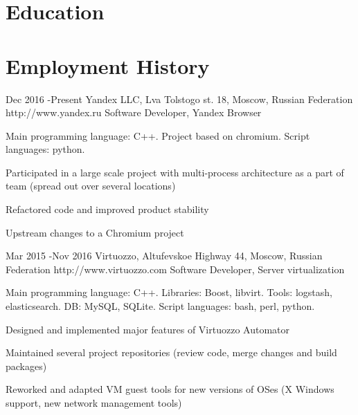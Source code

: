 \documentclass[10pt]{article} %
\begin{document}
\section{Education}



\section{Employment History}

\job
{Dec 2016 -}{Present}
{Yandex LLC, Lva Tolstogo st. 18, Moscow, Russian Federation}
{http://www.yandex.ru}
{Software Developer, Yandex Browser}
{
Main programming language: C++. Project based on chromium. Script languages: python.
\begin{itemize-noindent}
\setlength\itemsep{0em}
\item{Participated in a large scale project with multi-process architecture as a part of team (spread out over several locations)}
\item{Refactored code and improved product stability}
\item{Upstream changes to a Chromium project}
\end{itemize-noindent}
}


\job
{Mar 2015 -}{Nov 2016}
{Virtuozzo, Altufevskoe Highway 44, Moscow, Russian Federation}
{http://www.virtuozzo.com}
{Software Developer, Server virtualization}
{
Main programming language: C++. Libraries: Boost, libvirt. Tools: logstash, elasticsearch. DB: MySQL, SQLite. Script languages: bash, perl, python.
\begin{itemize-noindent}
\setlength\itemsep{0em}
\item{Designed and implemented major features of Virtuozzo Automator}
\item{Maintained several project repositories (review code, merge changes and build packages)}
\item{Reworked and adapted VM guest tools for new versions of OSes (X Windows support, new network management tools)}
\end{itemize-noindent}
}
\end{document}
